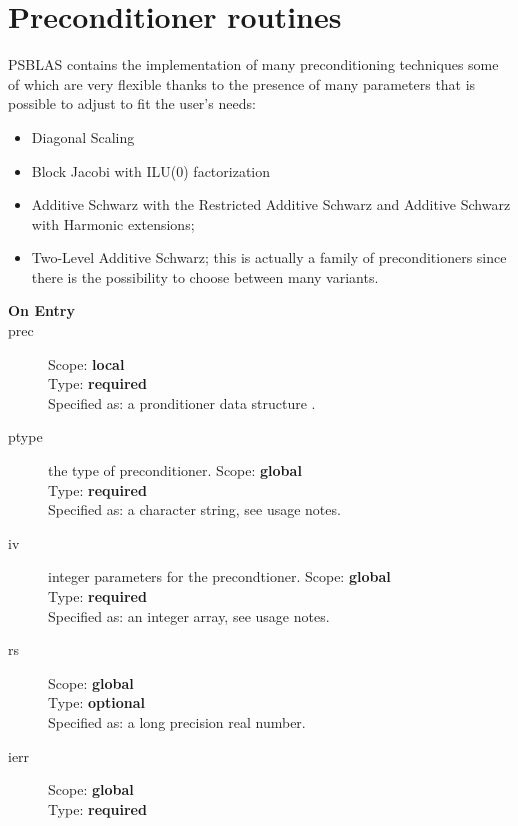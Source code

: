 \section{Preconditioner routines}
\label{sec:precs}

\label{sec:psprecs}
PSBLAS contains the implementation of many preconditioning
techniques some of which are very flexible thanks to the presence of
many parameters that is possible to adjust to fit the user's needs:
\begin{itemize}
\item Diagonal Scaling
\item Block Jacobi with ILU(0) factorization
\item Additive Schwarz with the Restricted Additive Schwarz and
  Additive Schwarz with Harmonic extensions;
\item Two-Level Additive Schwarz; this is actually a family of
  preconditioners since there is the possibility to choose between
  many variants.
\end{itemize}





\begin{description}
\item[\bf On Entry]
\item[prec] 
Scope: {\bf local} \\
Type: {\bf required}\\
Specified as: a pronditioner data structure \precdata.
\item[ptype] the type of preconditioner. 
Scope: {\bf global} \\
Type: {\bf required}\\
Specified as: a character string, see usage notes.
\item[iv] integer parameters for the precondtioner. 
Scope: {\bf global} \\
Type: {\bf required}\\
Specified as: an integer array, see usage notes. 
\item[rs] 
Scope: {\bf global} \\
Type: {\bf optional}\\
Specified as: a long precision real number.

\item[ierr] 
Scope: {\bf global} \\
Type: {\bf required}\\
\end{description}
